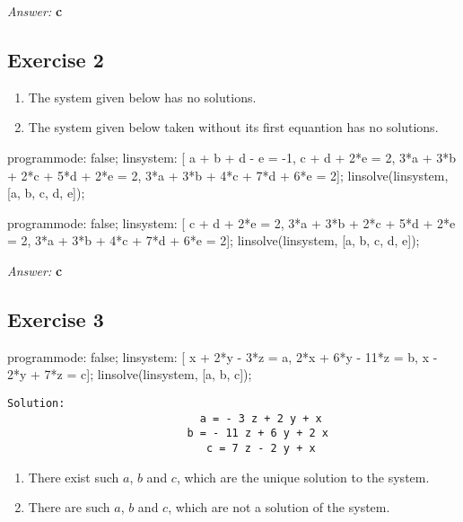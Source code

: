 \documentclass[11pt]{article}
\begin{document}
\emph{Answer:} \textbf{c}
\subsection{Exercise 2}
\label{sec-2-2}
\begin{enumerate}
\item The system given below has no solutions.
\item The system given below taken without its first equantion has no solutions.
\end{enumerate}

\begin{maxima}
programmode: false;
linsystem: [  a +   b +         d -   e = -1,
                          c +   d + 2*e = 2,
            3*a + 3*b + 2*c + 5*d + 2*e = 2,
            3*a + 3*b + 4*c + 7*d + 6*e = 2];
linsolve(linsystem, [a, b, c, d, e]);
\end{maxima}

\begin{maxima}
programmode: false;
linsystem: [              c +   d + 2*e = 2,
            3*a + 3*b + 2*c + 5*d + 2*e = 2,
            3*a + 3*b + 4*c + 7*d + 6*e = 2];
linsolve(linsystem, [a, b, c, d, e]);
\end{maxima}

\emph{Answer:} \textbf{c}
\subsection{Exercise 3}
\label{sec-2-3}

\begin{maxima}
programmode: false;
linsystem: [  x + 2*y -  3*z = a,
            2*x + 6*y - 11*z = b,
              x - 2*y +  7*z = c];
linsolve(linsystem, [a, b, c]);
\end{maxima}

\begin{verbatim}
Solution:
                              a = - 3 z + 2 y + x
                            b = - 11 z + 6 y + 2 x
                               c = 7 z - 2 y + x
\end{verbatim}


\begin{enumerate}
\item There exist such $a$, $b$ and $c$, which are the unique solution to
the system.
\item There are such $a$, $b$ and $c$, which are not a solution of the system.
\end{enumerate}
\end{document}
